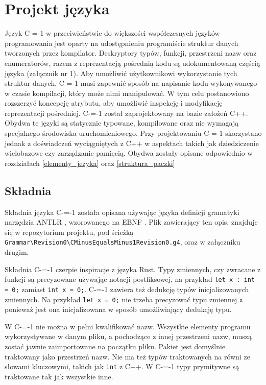 \section{Projekt języka}
\label{Language_desig}
Język C-=-1 w przeciwieństwie do większości współczesnych języków programowania jest oparty na udostępnieniu programiście struktur danych tworzonych przez kompilator. Deskryptory typów, funkcji, przestrzeni nazw oraz enumeratorów, razem z reprezentacją pośrednią kodu są udokumentowaną częścią języka (załącznik nr 1).
Aby umożliwić użytkownikowi wykorzystanie tych struktur danych, C-=-1 musi zapewnić sposób na napisanie kodu wykonywanego w czasie kompilacji, który może nimi manipulować. W tym celu postanowiono rozszerzyć koncepcję atrybutu, aby umożliwić inspekcję i modyfikację reprezentacji pośredniej.
C-=-1 został zaprojektowany na bazie założeń C++. Obydwa te języki są statycznie typowane, kompilowane oraz nie wymagają specjalnego środowiska uruchomieniowego.
Przy projektowaniu C-=-1 skorzystano jednak z doświadczeń wyciągniętych z C++ w aspektach takich jak dziedziczenie wielobazowe czy zarządzanie pamięcią. Obydwa zostały opisane odpowiednio w rozdziałach \ref{elementy_jezyka} oraz \ref{struktura_paczki}

\subsection{Składnia}

Składnia języka C-=-1 została opisana używając języka definicji gramatyki narzędzia ANTLR \cite{antlr}, wzorowanego na EBNF \cite{ebnf}.
Plik zawierający ten opis, znajduje się w repozytorium projektu, pod ścieżką \lstinline{Grammar\Revision0\CMinusEqualsMinus1Revision0.g4}, oraz w załączniku drugim.

Składnia C-=-1 czerpie inspiracje z języka Rust.
Typy zmiennych, czy zwracane z funkcji są precyzowane używając notacji postfiksowej, na przykład \lstinline{let x : int = 0;} zamiast \lstinline{int x = 0;}.
C-=-1 zawiera też dedukcję typów inicjalizowanych zmiennych.
Na przykład \lstinline{let x = 0;} nie trzeba precyzować typu zmiennej \lstinline{x} ponieważ jest ona inicjalizowana w sposób umożliwiający dedukcję typu.

W C-=-1 nie można w pełni kwalifikować nazw.
Wszystkie elementy programu wykorzystywane w danym pliku, a pochodzące z innej przestrzeni nazw, muszą zostać jawnie zaimportowane na początku pliku.
Pakiet jest domyślnie traktowany jako przestrzeń nazw.
Nie ma też typów traktowanych na równi ze słowami kluczowymi, takich jak \lstinline{int} z C++.
W C-=-1 typy prymitywne są traktowane tak jak wszystkie inne.


